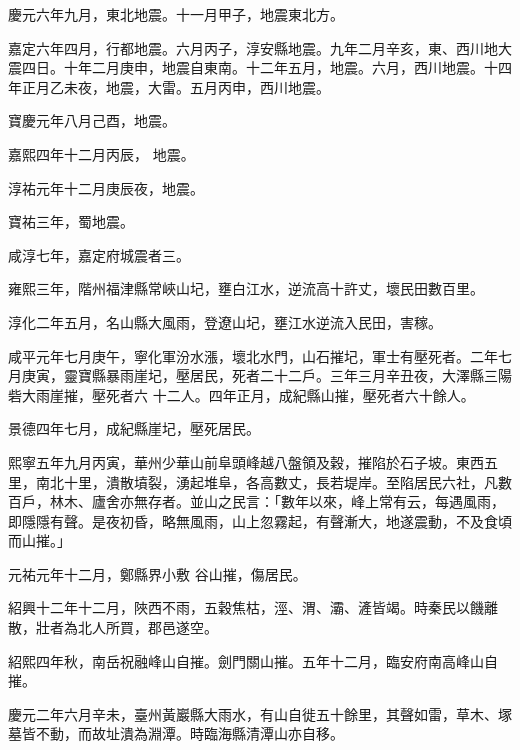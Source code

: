 \begin{pinyinscope}
 慶元六年九月，東北地震。十一月甲子，地震東北方。



 嘉定六年四月，行都地震。六月丙子，淳安縣地震。九年二月辛亥，東、西川地大震四日。十年二月庚申，地震自東南。十二年五月，地震。六月，西川地震。十四年正月乙未夜，地震，大雷。五月丙申，西川地震。



 寶慶元年八月己酉，地震。



 嘉熙四年十二月丙辰，
 地震。



 淳祐元年十二月庚辰夜，地震。



 寶祐三年，蜀地震。



 咸淳七年，嘉定府城震者三。



 雍熙三年，階州福津縣常峽山圮，壅白江水，逆流高十許丈，壞民田數百里。



 淳化二年五月，名山縣大風雨，登遼山圮，壅江水逆流入民田，害稼。



 咸平元年七月庚午，寧化軍汾水漲，壞北水門，山石摧圮，軍士有壓死者。二年七月庚寅，靈寶縣暴雨崖圮，壓居民，死者二十二戶。三年三月辛丑夜，大澤縣三陽砦大雨崖摧，壓死者六
 十二人。四年正月，成紀縣山摧，壓死者六十餘人。



 景德四年七月，成紀縣崖圮，壓死居民。



 熙寧五年九月丙寅，華州少華山前阜頭峰越八盤領及穀，摧陷於石子坡。東西五里，南北十里，潰散墳裂，湧起堆阜，各高數丈，長若堤岸。至陷居民六社，凡數百戶，林木、廬舍亦無存者。並山之民言：「數年以來，峰上常有云，每遇風雨，即隱隱有聲。是夜初昏，略無風雨，山上忽霧起，有聲漸大，地遂震動，不及食頃而山摧。」



 元祐元年十二月，鄭縣界小敷
 谷山摧，傷居民。



 紹興十二年十二月，陜西不雨，五穀焦枯，涇、渭、灞、滻皆竭。時秦民以饑離散，壯者為北人所買，郡邑遂空。



 紹熙四年秋，南岳祝融峰山自摧。劍門關山摧。五年十二月，臨安府南高峰山自摧。



 慶元二年六月辛未，臺州黃巖縣大雨水，有山自徙五十餘里，其聲如雷，草木、塚墓皆不動，而故址潰為淵潭。時臨海縣清潭山亦自移。




\end{pinyinscope}
